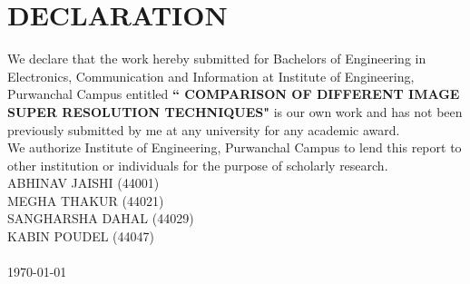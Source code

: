 \newpage
{}
\section*{DECLARATION}
We declare that the work hereby submitted for Bachelors of Engineering in Electronics, Communication and Information at Institute of Engineering, Purwanchal Campus entitled \textbf{`` COMPARISON OF DIFFERENT IMAGE SUPER RESOLUTION TECHNIQUES"} is our own work and has not been previously submitted by me at any university for any academic award.\\
We authorize Institute of Engineering, Purwanchal Campus to lend this report to other institution or individuals for the purpose of scholarly research.
\vspace{1cm}\\
ABHINAV JAISHI (44001)\\
MEGHA THAKUR (44021)\\
SANGHARSHA DAHAL (44029)\\
KABIN POUDEL (44047)\\
\\
\today
